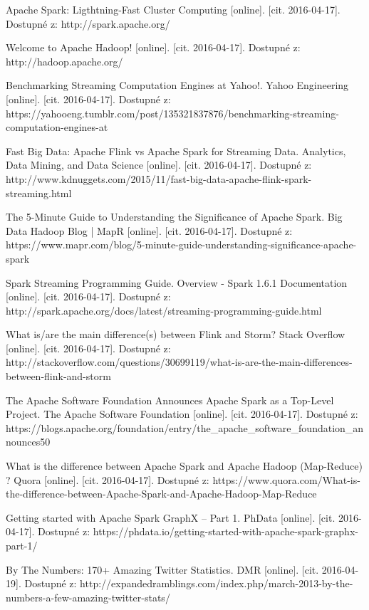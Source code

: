 \documentclass[thesis=B,czech]{FITthesis}[2012/06/26]
\begin{document}
\begin{thebibliography}{1}
Apache Spark: Ligthtning-Fast Cluster Computing [online]. [cit. 2016-04-17]. Dostupné z: http://spark.apache.org/

Welcome to Apache Hadoop! [online]. [cit. 2016-04-17]. Dostupné z: http://hadoop.apache.org/

Benchmarking Streaming Computation Engines at Yahoo!. Yahoo Engineering [online]. [cit. 2016-04-17]. Dostupné z: https://yahooeng.tumblr.com/post/135321837876/benchmarking-streaming-computation-engines-at

Fast Big Data: Apache Flink vs Apache Spark for Streaming Data. Analytics, Data Mining, and Data Science [online]. [cit. 2016-04-17]. Dostupné z: http://www.kdnuggets.com/2015/11/fast-big-data-apache-flink-spark-streaming.html

The 5-Minute Guide to Understanding the Significance of Apache Spark. Big Data Hadoop Blog | MapR [online]. [cit. 2016-04-17]. Dostupné z: https://www.mapr.com/blog/5-minute-guide-understanding-significance-apache-spark

Spark Streaming Programming Guide. Overview - Spark 1.6.1 Documentation [online]. [cit. 2016-04-17]. Dostupné z: http://spark.apache.org/docs/latest/streaming-programming-guide.html

What is/are the main difference(s) between Flink and Storm? Stack Overflow [online]. [cit. 2016-04-17]. Dostupné z: http://stackoverflow.com/questions/30699119/what-is-are-the-main-differences-between-flink-and-storm

The Apache Software Foundation Announces Apache Spark as a Top-Level Project. The Apache Software Foundation [online]. [cit. 2016-04-17]. Dostupné z: https://blogs.apache.org/foundation/entry/the\_apache\_software\_foundation\_announces50

What is the difference between Apache Spark and Apache Hadoop (Map-Reduce) ? Quora [online]. [cit. 2016-04-17]. Dostupné z: https://www.quora.com/What-is-the-difference-between-Apache-Spark-and-Apache-Hadoop-Map-Reduce

Getting started with Apache Spark GraphX – Part 1. PhData [online]. [cit. 2016-04-17]. Dostupné z: https://phdata.io/getting-started-with-apache-spark-graphx-part-1/

By The Numbers: 170+ Amazing Twitter Statistics. DMR [online]. [cit. 2016-04-19]. Dostupné z: http://expandedramblings.com/index.php/march-2013-by-the-numbers-a-few-amazing-twitter-stats/


\end{thebibliography}
\end{document}
